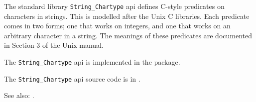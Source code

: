 
The standard library {\tt String\_Chartype} api defines 
C-style predicates on characters in strings.  This is modelled after the Unix C libraries.  
Each predicate comes in two forms; one that works on integers, and one 
that works on an arbitrary character in a string.  The meanings of these 
predicates are documented in Section 3 of the Unix manual. 

The {\tt String\_Chartype} api is implemented in the  package.

The {\tt String\_Chartype} api source code is in .

See also: .

